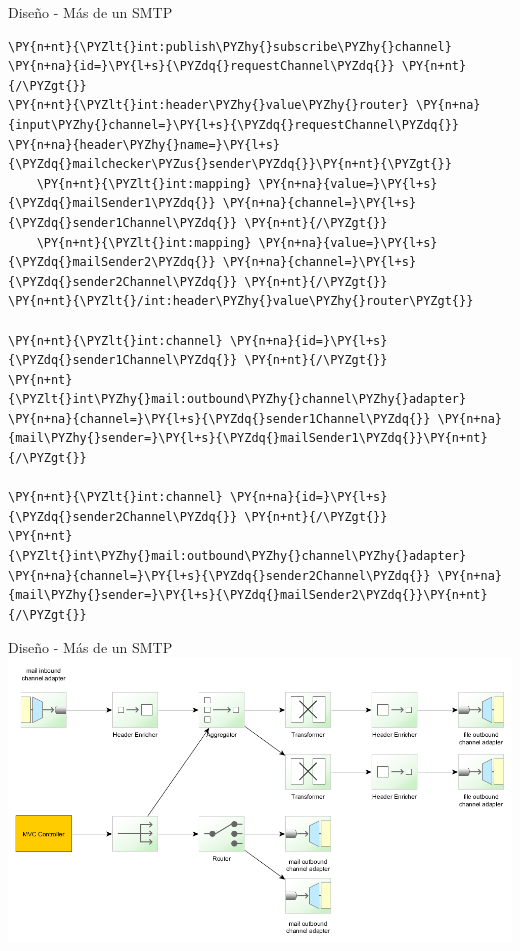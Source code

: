 \documentclass{beamer}
\begin{document}
\begin{frame}[fragile]{Diseño - Más de un SMTP}
\begin{Verbatim}[fontsize=\tiny,commandchars=\\\{\}]
\PY{n+nt}{\PYZlt{}int:publish\PYZhy{}subscribe\PYZhy{}channel} \PY{n+na}{id=}\PY{l+s}{\PYZdq{}requestChannel\PYZdq{}} \PY{n+nt}{/\PYZgt{}}
\PY{n+nt}{\PYZlt{}int:header\PYZhy{}value\PYZhy{}router} \PY{n+na}{input\PYZhy{}channel=}\PY{l+s}{\PYZdq{}requestChannel\PYZdq{}} \PY{n+na}{header\PYZhy{}name=}\PY{l+s}{\PYZdq{}mailchecker\PYZus{}sender\PYZdq{}}\PY{n+nt}{\PYZgt{}}
    \PY{n+nt}{\PYZlt{}int:mapping} \PY{n+na}{value=}\PY{l+s}{\PYZdq{}mailSender1\PYZdq{}} \PY{n+na}{channel=}\PY{l+s}{\PYZdq{}sender1Channel\PYZdq{}} \PY{n+nt}{/\PYZgt{}}
    \PY{n+nt}{\PYZlt{}int:mapping} \PY{n+na}{value=}\PY{l+s}{\PYZdq{}mailSender2\PYZdq{}} \PY{n+na}{channel=}\PY{l+s}{\PYZdq{}sender2Channel\PYZdq{}} \PY{n+nt}{/\PYZgt{}}
\PY{n+nt}{\PYZlt{}/int:header\PYZhy{}value\PYZhy{}router\PYZgt{}}

\PY{n+nt}{\PYZlt{}int:channel} \PY{n+na}{id=}\PY{l+s}{\PYZdq{}sender1Channel\PYZdq{}} \PY{n+nt}{/\PYZgt{}}
\PY{n+nt}{\PYZlt{}int\PYZhy{}mail:outbound\PYZhy{}channel\PYZhy{}adapter} \PY{n+na}{channel=}\PY{l+s}{\PYZdq{}sender1Channel\PYZdq{}} \PY{n+na}{mail\PYZhy{}sender=}\PY{l+s}{\PYZdq{}mailSender1\PYZdq{}}\PY{n+nt}{/\PYZgt{}}

\PY{n+nt}{\PYZlt{}int:channel} \PY{n+na}{id=}\PY{l+s}{\PYZdq{}sender2Channel\PYZdq{}} \PY{n+nt}{/\PYZgt{}}
\PY{n+nt}{\PYZlt{}int\PYZhy{}mail:outbound\PYZhy{}channel\PYZhy{}adapter} \PY{n+na}{channel=}\PY{l+s}{\PYZdq{}sender2Channel\PYZdq{}} \PY{n+na}{mail\PYZhy{}sender=}\PY{l+s}{\PYZdq{}mailSender2\PYZdq{}}\PY{n+nt}{/\PYZgt{}}
\end{Verbatim}
\end{frame}

\begin{frame}{Diseño - Más de un SMTP}
\includegraphics[width=1.0\linewidth]{sp-int-13}
\end{frame}
\end{document}
